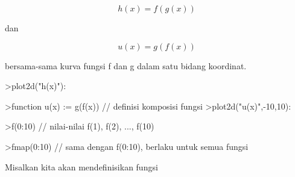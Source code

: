 \documentclass{article}
\begin{document}
\begin{eulernotebook}
\begin{eulercomment}
\begin{eulercomment}
\begin{eulercomment}
\end{eulercomment}
\begin{eulerformula}
\[
h(x)=f(g(x))
\]
\end{eulerformula}
\begin{eulercomment}
dan

\end{eulercomment}
\begin{eulerformula}
\[
u(x)=g(f(x))
\]
\end{eulerformula}
\begin{eulercomment}
bersama-sama kurva fungsi f dan g dalam satu bidang koordinat.
\end{eulercomment}
\begin{eulerprompt}
>plot2d("h(x)"):
\end{eulerprompt}
\begin{eulerprompt}
>function u(x) := g(f(x)) // definisi komposisi fungsi
>plot2d("u(x)",-10,10):
\end{eulerprompt}
\begin{eulerprompt}
>f(0:10) // nilai-nilai f(1), f(2), ..., f(10)
\end{eulerprompt}
\begin{euleroutput}
  [1,  4.31978,  10.4826,  19.1516,  32.4692,  50.3833,  72.7562,
  99.929,  130.69,  163.51,  200.58]
\end{euleroutput}
\begin{eulerprompt}
>fmap(0:10) // sama dengan f(0:10), berlaku untuk semua fungsi
\end{eulerprompt}
\begin{euleroutput}
  [1,  4.31978,  10.4826,  19.1516,  32.4692,  50.3833,  72.7562,
  99.929,  130.69,  163.51,  200.58]
\end{euleroutput}
\begin{eulercomment}
Misalkan kita akan mendefinisikan fungsi


\end{eulercomment}
\end{eulercomment}
\end{eulercomment}
\end{eulernotebook}
\end{document}
